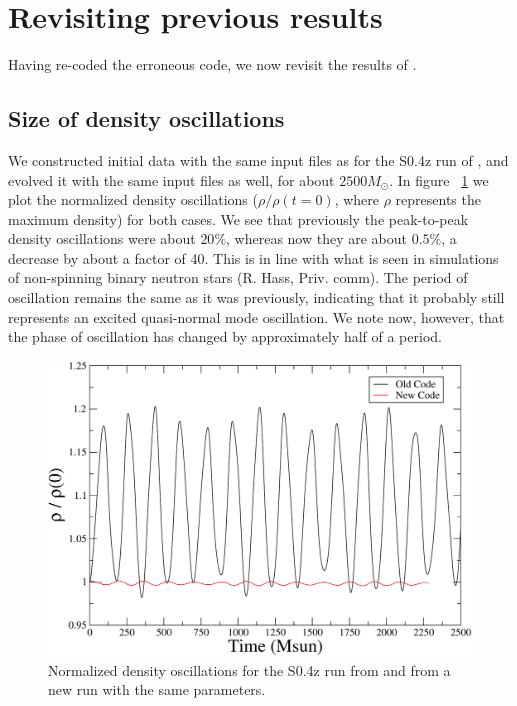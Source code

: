 \section{Revisiting previous results}
Having re-coded the erroneous code, we now revisit the results of \cite{Tacik:2015tja}.

\subsection{Size of density oscillations}
We constructed initial data with the same input files as for the S0.4z
run of \cite{Tacik:2015tja}, and evolved it with the same input files
as well, for about $2500M_{\odot}$. In figure ~\ref{fig:NewS4Density}
we plot the normalized density oscillations ($\rho / \rho(t=0)$, where
$\rho$ represents the maximum density) for both cases. We see that
previously the peak-to-peak density oscillations were about $20\%$,
whereas now they are about $0.5\%$, a decrease by about a factor of
40. This is in line with what is seen in simulations of non-spinning
binary neutron stars (R. Hass, Priv. comm). The period of oscillation remains the same as it was previously,
indicating that it probably still represents an excited quasi-normal mode oscillation. We note now, however, that the phase of oscillation has changed by approximately half of a period.

\begin{figure}[!ht]
\includegraphics[width=0.95\columnwidth]{chap6/NewS4Density}
\caption{\label{fig:NewS4Density} Normalized density oscillations for
  the S0.4z run from \cite{Tacik:2015tja} and from a new run with the same
parameters.}
\end{figure}

